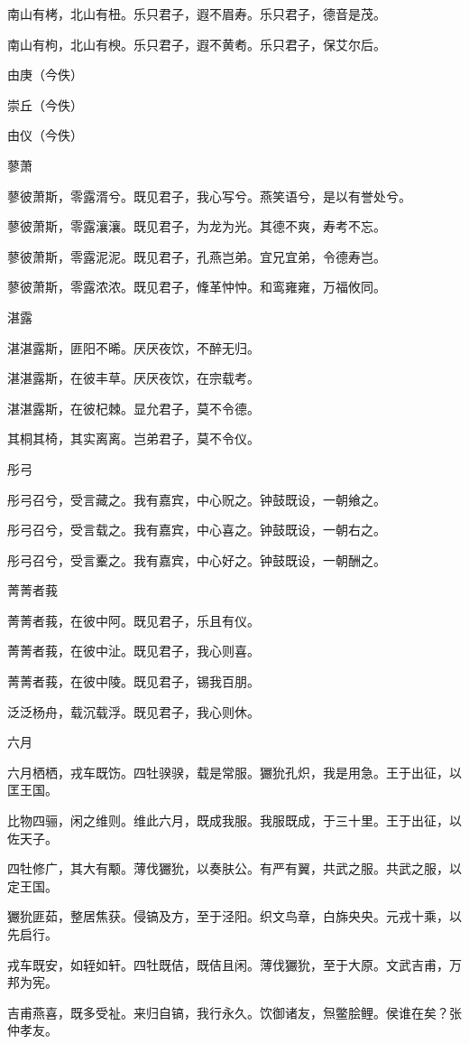南山有栲，北山有杻。乐只君子，遐不眉寿。乐只君子，德音是茂。

南山有枸，北山有楰。乐只君子，遐不黄耇。乐只君子，保艾尔后。

由庚（今佚）

崇丘（今佚）

由仪（今佚）

蓼萧

蓼彼萧斯，零露湑兮。既见君子，我心写兮。燕笑语兮，是以有誉处兮。

蓼彼萧斯，零露瀼瀼。既见君子，为龙为光。其德不爽，寿考不忘。

蓼彼萧斯，零露泥泥。既见君子，孔燕岂弟。宜兄宜弟，令德寿岂。

蓼彼萧斯，零露浓浓。既见君子，鞗革忡忡。和鸾雍雍，万福攸同。

湛露

湛湛露斯，匪阳不晞。厌厌夜饮，不醉无归。

湛湛露斯，在彼丰草。厌厌夜饮，在宗载考。

湛湛露斯，在彼杞棘。显允君子，莫不令德。

其桐其椅，其实离离。岂弟君子，莫不令仪。

彤弓

彤弓召兮，受言藏之。我有嘉宾，中心贶之。钟鼓既设，一朝飨之。

彤弓召兮，受言载之。我有嘉宾，中心喜之。钟鼓既设，一朝右之。

彤弓召兮，受言櫜之。我有嘉宾，中心好之。钟鼓既设，一朝酬之。

菁菁者莪

菁菁者莪，在彼中阿。既见君子，乐且有仪。

菁菁者莪，在彼中沚。既见君子，我心则喜。

菁菁者莪，在彼中陵。既见君子，锡我百朋。

泛泛杨舟，载沉载浮。既见君子，我心则休。

六月

六月栖栖，戎车既饬。四牡骙骙，载是常服。玁狁孔炽，我是用急。王于出征，以匡王国。

比物四骊，闲之维则。维此六月，既成我服。我服既成，于三十里。王于出征，以佐天子。

四牡修广，其大有颙。薄伐玁狁，以奏肤公。有严有翼，共武之服。共武之服，以定王国。

玁狁匪茹，整居焦获。侵镐及方，至于泾阳。织文鸟章，白旆央央。元戎十乘，以先启行。

戎车既安，如轾如轩。四牡既佶，既佶且闲。薄伐玁狁，至于大原。文武吉甫，万邦为宪。

吉甫燕喜，既多受祉。来归自镐，我行永久。饮御诸友，炰鳖脍鲤。侯谁在矣？张仲孝友。

